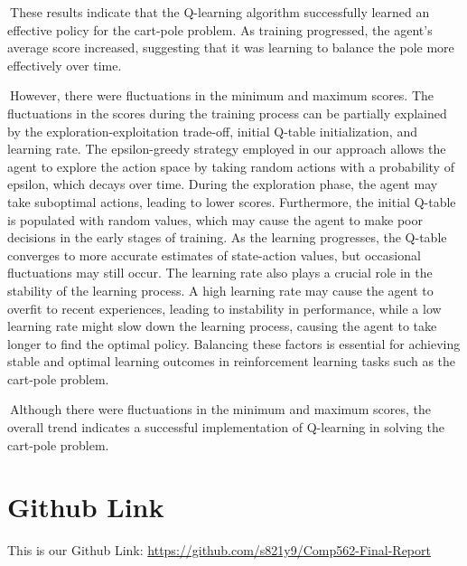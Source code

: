 \documentclass{article}
\begin{document}
$\>$These results indicate that the Q-learning algorithm successfully learned an effective policy for the cart-pole problem. As training progressed, the agent's average score increased, suggesting that it was learning to balance the pole more effectively over time. 
 
$\>$However, there were fluctuations in the minimum and maximum scores. The fluctuations in the scores during the training process can be partially explained by the exploration-exploitation trade-off, initial Q-table initialization, and learning rate. The epsilon-greedy strategy employed in our approach allows the agent to explore the action space by taking random actions with a probability of epsilon, which decays over time. During the exploration phase, the agent may take suboptimal actions, leading to lower scores. Furthermore, the initial Q-table is populated with random values, which may cause the agent to make poor decisions in the early stages of training. As the learning progresses, the Q-table converges to more accurate estimates of state-action values, but occasional fluctuations may still occur. The learning rate also plays a crucial role in the stability of the learning process. A high learning rate may cause the agent to overfit to recent experiences, leading to instability in performance, while a low learning rate might slow down the learning process, causing the agent to take longer to find the optimal policy. Balancing these factors is essential for achieving stable and optimal learning outcomes in reinforcement learning tasks such as the cart-pole problem. 

$\>$Although there were fluctuations in the minimum and maximum scores,  the overall trend indicates a successful implementation of Q-learning in solving the cart-pole problem.

\section{Github Link}
 
 This is our Github Link: \quad \url{https://github.com/s821y9/Comp562-Final-Report}

 
 
 
 
\end{document}
